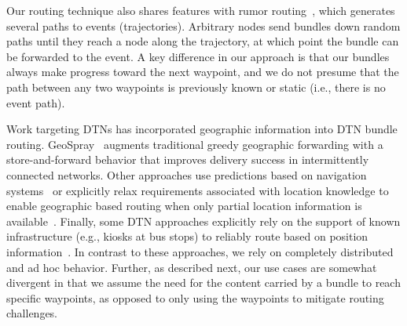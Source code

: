 Our routing technique also shares features with rumor routing~\cite{braginsky02:RRA}, which generates several paths to events (trajectories). Arbitrary nodes send bundles down random paths until they reach a node along the trajectory, at which point the bundle can be forwarded to the event. A key difference in our approach is that our bundles always make progress toward the next waypoint, and we do not presume that the path between any two waypoints is previously known or static (i.e., there is no event path).

Work targeting DTNs has incorporated geographic information into DTN bundle routing. GeoSpray~\cite{soares14:geospray} augments traditional greedy geographic forwarding with a store-and-forward behavior that improves delivery success in intermittently connected networks. Other approaches use predictions based on navigation systems~\cite{cheng10:geodtn} or explicitly relax requirements associated with location knowledge to enable geographic based routing when only partial location information is available~\cite{kuiper11:geographical}. Finally, some DTN approaches explicitly rely on the support of known infrastructure (e.g., kiosks at bus stops) to reliably route based on position information~\cite{park12:position}. In contrast to these approaches, we rely on completely distributed and ad hoc behavior. Further, as described next, our use cases are somewhat divergent in that we assume the need for the content carried by a bundle to reach specific waypoints, as opposed to only using the waypoints to mitigate routing challenges.
